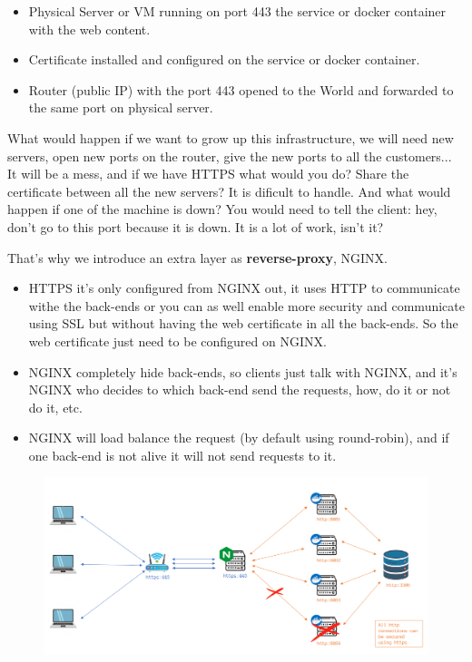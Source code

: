 \documentclass{article}
\begin{document}
\begin{itemize}
    \item Physical Server or VM running on port 443 the service or docker container with the web content.
    \item Certificate installed and configured on the service or docker container.
    \item Router (public IP) with the port 443 opened to the World and forwarded to the same port on physical server.
\end{itemize}

What would happen if we want to grow up this infrastructure, we will need new servers, open new ports on the router, give the new ports to all the customers... It will be a mess, and if we have HTTPS what would you do? Share the certificate between all the new servers? It is dificult to handle. And what would happen if one of the machine is down? You would need to tell the client: hey, don't go to this port because it is down. It is a lot of work, isn't it?

That's why we introduce an extra layer as \textbf{reverse-proxy}, NGINX.

\begin{itemize}
    \item HTTPS it's only configured from NGINX out, it uses HTTP to communicate withe the back-ends or you can as well enable more security and communicate using SSL but without having the web certificate in all the back-ends. So the web certificate just need to be configured on NGINX.
    \item NGINX completely hide back-ends, so clients just talk with NGINX, and it's NGINX who decides to which back-end send the requests, how, do it or not do it, etc.
    \item NGINX will load balance the request (by default using round-robin), and if one back-end is not alive it will not send requests to it.
\end{itemize}

\begin{figure}[H]
    \includegraphics[width=\textwidth]{pictures/scheme_nginx.png}
    \centering
\end{figure}
\end{document}
